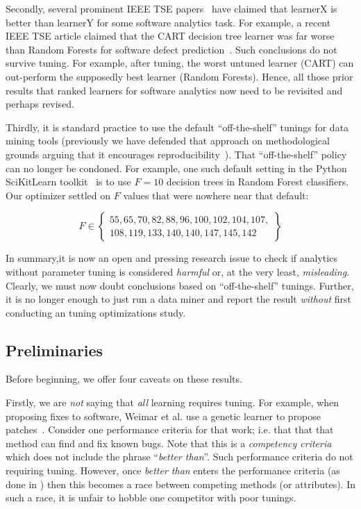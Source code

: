 \documentclass{sig-alternative}
\begin{document}
Secondly, several  prominent IEEE TSE papers~\cite{lessmann2008benchmarking,hall11,me07b} have claimed 
that learnerX is better than learnerY for some software analytics task.
For example, a recent IEEE TSE article claimed that the 
CART decision tree learner was far worse than Random Forests for
software defect prediction~\cite{lessmann2008benchmarking}. 
Such conclusions do not survive tuning.
For example,
after tuning, the worst untuned learner (CART) can out-perform the supposedly
best learner (Random Forests). Hence, all those prior results that ranked learners for software
analytics now need to be revisited and perhaps revised.

Thirdly, it is standard practice to use the default ``off-the-shelf'' tunings  for data mining tools (previously
we have defended that approach on methodological grounds arguing that it
encourages reproducibility~\cite{me15:book1}). That ``off-the-shelf''  policy
can no longer be condoned. For example, one such default setting
  in the Python \mbox{SciKitLearn} toolkit~\cite{scikit-learn}
is to use $F=10$ decision trees in  Random Forest classifiers.
Our optimizer settled on  $F$ values that were nowhere near that default:

{\scriptsize
\[F \in \left\{\begin{array}{l} 55,  65, 70,   82, 88, 96, 100,  102,  104, 107,\\
                                108,  119, 133,  140, 140,   147,  145,  142   \end{array}\right\}
\]}


In summary,it is now an open and pressing research issue to check if
analytics without parameter tuning is considered {\em harmful} or, at the 
very least, {\em misleading}.
Clearly, we must now doubt  conclusions based on
``off-the-shelf'' tunings.
Further,
it is no longer enough to just run a data miner and report the result
{\em without} first conducting an tuning optimizations study.

 

\subsection{Preliminaries}

Before beginning, we offer four caveats on these results.

Firstly, we are {\em not} saying that {\em all} learning requires
tuning. For example, when proposing fixes to software, Weimar et al. use a genetic learner
to propose patches~\cite{Weimer:2009}. Consider one performance criteria for that work; i.e. 
that   that that method can find and fix known bugs. Note that this is a {\em competency criteria}
which does not include the phrase  ``{\em better than}''. Such performance criteria do
not requiring tuning.  However, once {\em better than} enters the performance criteria
(as done in \cite{lessmann2008benchmarking,hall11,me07b,bell2013limited,rahman2013how,me02k,moser2008comparative,zimmermann2007predicting,herzig2013predicting})
then this becomes a race between competing methods (or attributes).  In such a race, it is unfair
to hobble one competitor with poor tunings. 
 
\end{document}
